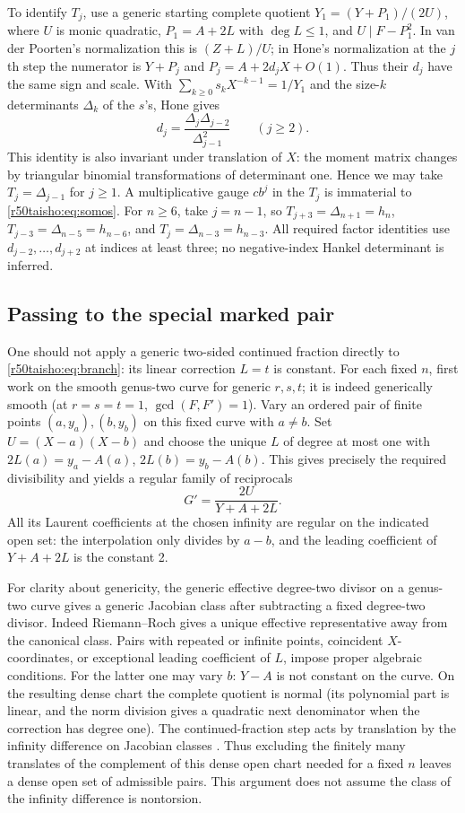 \documentclass[11pt,a4paper]{article}
\numberwithin{equation}{section}
\theoremstyle{definition}
\theoremstyle{remark}
\begin{document}
To identify $T_j$, use a generic starting complete quotient
$Y_1=(Y+P_1)/(2U)$, where $U$ is monic quadratic, $P_1=A+2L$ with
$\deg L\le1$, and $U\mid F-P_1^2$. In van der Poorten's normalization this
is $(Z+L)/U$; in Hone's normalization at the $j$th step the numerator is
$Y+P_j$ and $P_j=A+2d_jX+O(1)$. Thus their $d_j$ have the same sign and
scale. With $\sum_{k\ge0}s_kX^{-k-1}=1/Y_1$ and the size-$k$ determinants
$\Delta_k$ of the $s$'s, Hone \cite[Thm.~4.1, (4.3), (4.14)]{r50taisho:H} gives
\[
 d_j=\frac{\Delta_j\Delta_{j-2}}{\Delta_{j-1}^2}\qquad(j\ge2).
\]
This identity is also invariant under translation of $X$: the moment
matrix changes by triangular binomial transformations of determinant one.
Hence we may take $T_j=\Delta_{j-1}$ for $j\ge1$. A multiplicative gauge
$c b^j$ in the $T_j$ is immaterial to \eqref{r50taisho:eq:somos}. For $n\ge6$,
take $j=n-1$, so $T_{j+3}=\Delta_{n+1}=h_n$,
$T_{j-3}=\Delta_{n-5}=h_{n-6}$, and $T_j=\Delta_{n-3}=h_{n-3}$.
All required factor identities use $d_{j-2},\ldots,d_{j+2}$ at indices
at least three; no negative-index Hankel determinant is inferred.

\subsection{Passing to the special marked pair}
One should not apply a generic two-sided continued fraction directly to
\eqref{r50taisho:eq:branch}: its linear correction $L=t$ is constant.
For each fixed $n$, first work on the smooth genus-two curve for generic
$r,s,t$; it is indeed generically smooth (at $r=s=t=1$,
$\gcd(F,F')=1$). Vary an ordered pair of finite points $(a,y_a),(b,y_b)$
on this fixed curve with $a\ne b$. Set $U=(X-a)(X-b)$ and choose the
unique $L$ of degree at most one with
$2L(a)=y_a-A(a)$, $2L(b)=y_b-A(b)$. This gives precisely the required
divisibility and yields a regular family of reciprocals
\[
   G'=\frac{2U}{Y+A+2L}.
\]
All its Laurent coefficients at the chosen infinity are regular on the
indicated open set: the interpolation only divides by $a-b$, and the
leading coefficient of $Y+A+2L$ is the constant 2.

For clarity about genericity, the generic effective degree-two divisor on
a genus-two curve gives a generic Jacobian class after subtracting a fixed
degree-two divisor. Indeed Riemann--Roch gives a unique effective
representative away from the canonical class. Pairs with repeated or
infinite points, coincident $X$-coordinates, or exceptional leading
coefficient of $L$, impose proper algebraic conditions. For the latter
one may vary $b$: $Y-A$ is not constant on the curve. On the resulting
dense chart the complete quotient is normal (its polynomial part is
linear, and the norm division gives a quadratic next denominator when the
correction has degree one). The continued-fraction step acts by
translation by the infinity difference on Jacobian classes
\cite[remarks after Thm.~3.2]{r50taisho:V}. Thus excluding the finitely many
translates of the complement of this dense open chart needed for a fixed
$n$ leaves a dense open set of admissible pairs. This argument does not
assume the class of the infinity difference is nontorsion.
\end{document}
